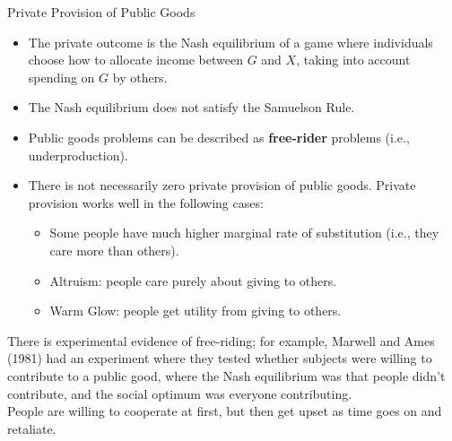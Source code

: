 \documentclass[8pt]{extarticle}
\begin{document}
  \begin{problem}{Private Provision of Public Goods}
    \begin{itemize}
      \item The private outcome is the Nash equilibrium of a game where individuals choose how to allocate income between $G$ and $X$, taking into account spending on $G$ by others.
      \item The Nash equilibrium does not satisfy the Samuelson Rule.
      \item Public goods problems can be described as \textbf{free-rider} problems (i.e., underproduction).
      \item There is not necessarily zero private provision of public goods. Private provision works well in the following cases:
        \begin{itemize}
          \item Some people have much higher marginal rate of substitution (i.e., they care more than others).
          \item Altruism: people care purely about giving to others.
          \item Warm Glow: people get utility from giving to others.
        \end{itemize}
    \end{itemize}
    There is experimental evidence of free-riding; for example, Marwell and Ames (1981) had an experiment where they tested whether subjects were willing to contribute to a public good, where the Nash equilibrium was that people didn't contribute, and the social optimum was everyone contributing.\\

    People are willing to cooperate at first, but then get upset as time goes on and retaliate.
  \end{problem}
\end{document}
